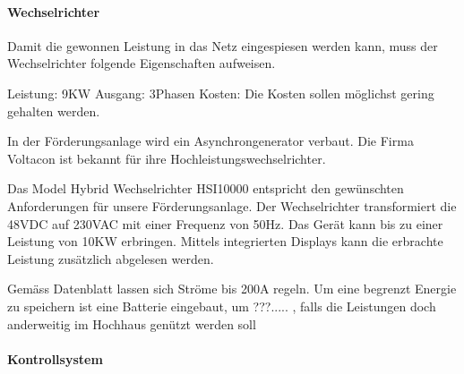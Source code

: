 \paragraph{Wechselrichter}



Damit die gewonnen Leistung in das Netz eingespiesen werden kann, muss der Wechselrichter folgende Eigenschaften aufweisen. 

Leistung: 	9KW \newline
Ausgang:	3Phasen \newline
Kosten:		Die Kosten sollen möglichst gering gehalten werden. \newline

In der Förderungsanlage wird ein Asynchrongenerator verbaut. Die Firma Voltacon ist bekannt für ihre Hochleistungswechselrichter.

Das Model Hybrid Wechselrichter HSI10000 entspricht den gewünschten Anforderungen für unsere Förderungsanlage. Der Wechselrichter transformiert die 48VDC auf 230VAC mit einer Frequenz von 50\si{\hertz}. Das Gerät kann bis zu einer Leistung von 10KW erbringen. Mittels integrierten Displays kann die erbrachte Leistung zusätzlich abgelesen werden. 

Gemäss Datenblatt lassen sich Ströme bis 200A regeln. Um eine begrenzt Energie zu speichern ist eine Batterie eingebaut, um ???.....
, falls die Leistungen doch anderweitig im Hochhaus genützt werden soll %


\paragraph{Kontrollsystem}






